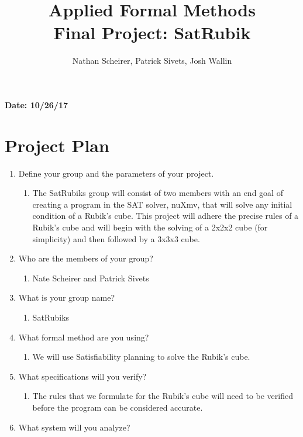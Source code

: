 \documentclass{elsarticle} %
\begin{document}
\title{Applied Formal Methods\\ Final Project: SatRubik}

\author{Nathan Scheirer, Patrick Sivets, Josh Wallin}

\maketitle


{\bf Date: 10/26/17}


\section{Project Plan}
\begin{enumerate}
\item Define your group and the parameters of your project.
	\begin{enumerate}
	\item The SatRubiks group will consist of two members with an end goal of creating a program in the SAT solver, nuXmv, that will solve any initial condition of a Rubik's cube. This project will adhere the precise rules of a Rubik's cube and will begin with the solving of a 2x2x2 cube (for simplicity) and then followed by a 3x3x3 cube.
	\end{enumerate}
\item Who are the members of your group?
	\begin{enumerate}
	\item Nate Scheirer and Patrick Sivets
	\end{enumerate}
\item What is your group name?
	\begin{enumerate}
	\item SatRubiks
	\end{enumerate}
\item What formal method are you using?
	\begin{enumerate}
	\item We will use Satisfiability planning to solve the Rubik's cube.
	\end{enumerate}
\item What specifications will you verify?
	\begin{enumerate}
	\item The rules that we formulate for the Rubik's cube will need to be verified before the program can be considered accurate.
	\end{enumerate}
\item What system will you analyze?

\end{enumerate}
\end{document}
